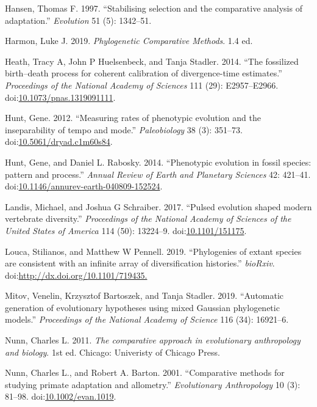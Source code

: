 \documentclass[]{article}
\begin{document}
\hypertarget{ref-Hansen1997}{}
Hansen, Thomas F. 1997. ``Stabilising selection and the comparative
analysis of adaptation.'' \emph{Evolution} 51 (5): 1342--51.

\hypertarget{ref-Harmon2019}{}
Harmon, Luke J. 2019. \emph{Phylogenetic Comparative Methods}. 1.4 ed.

\hypertarget{ref-Heath2014}{}
Heath, Tracy A, John P Huelsenbeck, and Tanja Stadler. 2014. ``The
fossilized birth--death process for coherent calibration of
divergence-time estimates.'' \emph{Proceedings of the National Academy
of Sciences} 111 (29): E2957--E2966.
doi:\href{https://doi.org/10.1073/pnas.1319091111}{10.1073/pnas.1319091111}.

\hypertarget{ref-Hunt2012}{}
Hunt, Gene. 2012. ``Measuring rates of phenotypic evolution and the
inseparability of tempo and mode.'' \emph{Paleobiology} 38 (3): 351--73.
doi:\href{https://doi.org/10.5061/dryad.c1m60s84}{10.5061/dryad.c1m60s84}.

\hypertarget{ref-Hunt2014}{}
Hunt, Gene, and Daniel L. Rabosky. 2014. ``Phenotypic evolution in
fossil species: pattern and process.'' \emph{Annual Review of Earth and
Planetary Sciences} 42: 421--41.
doi:\href{https://doi.org/10.1146/annurev-earth-040809-152524}{10.1146/annurev-earth-040809-152524}.

\hypertarget{ref-Landis2017}{}
Landis, Michael, and Joshua G Schraiber. 2017. ``Pulsed evolution shaped
modern vertebrate diversity.'' \emph{Proceedings of the National Academy
of Sciences of the United States of America} 114 (50): 13224--9.
doi:\href{https://doi.org/10.1101/151175}{10.1101/151175}.

\hypertarget{ref-Louca2019}{}
Louca, Stilianos, and Matthew W Pennell. 2019. ``Phylogenies of extant
species are consistent with an infinite array of diversification
histories.'' \emph{bioRxiv}.
doi:\href{https://doi.org/http://dx.doi.org/10.1101/719435.}{http://dx.doi.org/10.1101/719435.}

\hypertarget{ref-Mitov2019}{}
Mitov, Venelin, Krzysztof Bartoszek, and Tanja Stadler. 2019.
``Automatic generation of evolutionary hypotheses using mixed Gaussian
phylogenetic models.'' \emph{Proceedings of the National Academy of
Science} 116 (34): 16921--6.

\hypertarget{ref-Nunn2011}{}
Nunn, Charles L. 2011. \emph{The comparative approach in evolutionary
anthropology and biology}. 1st ed. Chicago: Univeristy of Chicago Press.

\hypertarget{ref-Nunn2001}{}
Nunn, Charles L., and Robert A. Barton. 2001. ``Comparative methods for
studying primate adaptation and allometry.'' \emph{Evolutionary
Anthropology} 10 (3): 81--98.
doi:\href{https://doi.org/10.1002/evan.1019}{10.1002/evan.1019}.
\end{document}
